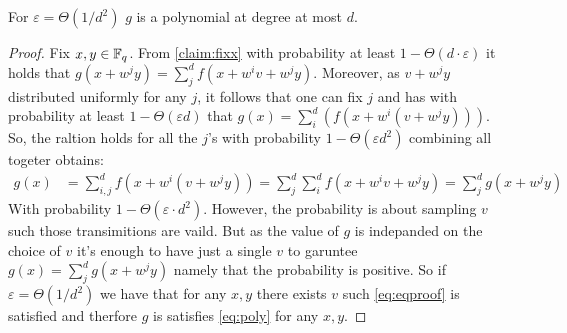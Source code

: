 \begin{claim}
  For $\varepsilon = \Theta(1/d^{2})$ $g$ is a polynomial at degree at most $d$. 
\end{claim}

\begin{proof}
  Fix $x,y \in \mathbb{F}_{q}$. From \cref{claim:fixx} with probability at least $1 - \Theta \left( d\cdot \varepsilon \right)$ it holds that $ g\left( x + w^{j}y \right) = \sum_{j}^{d}{f\left( x + w^{i}v + w^{j}y \right)}$. Moreover, as $ v+w^{j}y$ distributed uniformly for any $j$, it follows that one can fix $j$ and has with probability at least $1 - \Theta\left( \varepsilon d  \right)$ that  $g\left( x\right) = \sum_{i}^{d}{\left( f\left( x + w^{i}\left( v + w^{j}y \right) \right) \right)}$. So, the raltion holds for all the $j$'s with probability $1 - \Theta\left( \varepsilon d^{2} \right)$ combining all togeter obtains:  
  \begin{equation*}
    \label{eq:eqproof}
    \begin{split}
      g\left( x \right) &= \sum_{i,j}^{d}{f\left( x + w^{i}\left( v +w^{j}y\right) \right)} =  \sum_{j}^{d}\sum_{i}^{d}{f\left( x + w^{i}v + w^{j}y \right)} = \sum_{j}^{d}{g\left( x + w^{j}y \right)} 
    \end{split}
  \end{equation*}
  With probability $1 - \Theta \left( \varepsilon \cdot d^{2}\right)$. However, the probability is about sampling $v$ such those transimitions are vaild. But as the value of $g$ is indepanded on the choice of $v$ it's enough to have just a single $v$ to garuntee $g\left( x \right) = \sum_{j}^{d}{g\left( x + w^{j}y \right)}$ namely that the probability is positive. So if  $ \varepsilon = \Theta(1/d^{2}) $ we have that for any $x,y$ there exists $v$ such \cref{eq:eqproof} is satisfied and therfore $g$ is satisfies \cref{eq:poly} for any $x,y$. 
\end{proof}




